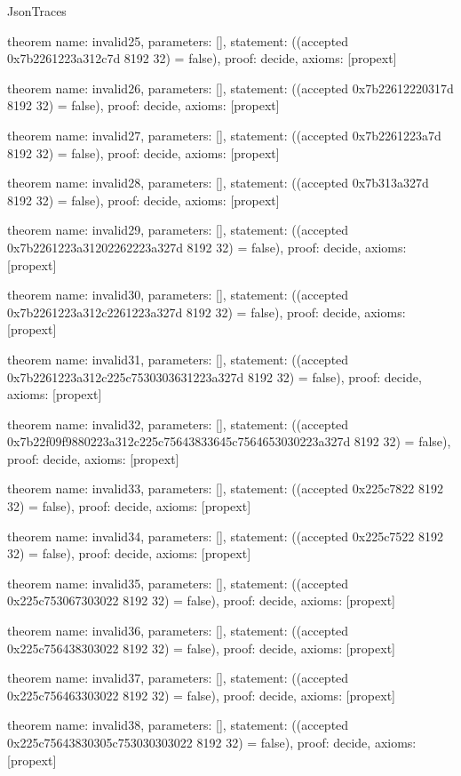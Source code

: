 \begin{lexlean}{JsonTraces}
\begin{semanticmodule}
theorem{
  name: invalid25,
  parameters: [],
  statement: ((accepted 0x7b2261223a312c7d 8192 32) = false),
  proof: decide{},
  axioms: [propext]
}

theorem{
  name: invalid26,
  parameters: [],
  statement: ((accepted 0x7b22612220317d 8192 32) = false),
  proof: decide{},
  axioms: [propext]
}

theorem{
  name: invalid27,
  parameters: [],
  statement: ((accepted 0x7b2261223a7d 8192 32) = false),
  proof: decide{},
  axioms: [propext]
}

theorem{
  name: invalid28,
  parameters: [],
  statement: ((accepted 0x7b313a327d 8192 32) = false),
  proof: decide{},
  axioms: [propext]
}

theorem{
  name: invalid29,
  parameters: [],
  statement: ((accepted 0x7b2261223a31202262223a327d 8192 32) = false),
  proof: decide{},
  axioms: [propext]
}

theorem{
  name: invalid30,
  parameters: [],
  statement: ((accepted 0x7b2261223a312c2261223a327d 8192 32) = false),
  proof: decide{},
  axioms: [propext]
}

theorem{
  name: invalid31,
  parameters: [],
  statement: ((accepted 0x7b2261223a312c225c7530303631223a327d 8192 32) = false),
  proof: decide{},
  axioms: [propext]
}

theorem{
  name: invalid32,
  parameters: [],
  statement: ((accepted 0x7b22f09f9880223a312c225c75643833645c7564653030223a327d 8192 32) = false),
  proof: decide{},
  axioms: [propext]
}

theorem{
  name: invalid33,
  parameters: [],
  statement: ((accepted 0x225c7822 8192 32) = false),
  proof: decide{},
  axioms: [propext]
}

theorem{
  name: invalid34,
  parameters: [],
  statement: ((accepted 0x225c7522 8192 32) = false),
  proof: decide{},
  axioms: [propext]
}

theorem{
  name: invalid35,
  parameters: [],
  statement: ((accepted 0x225c753067303022 8192 32) = false),
  proof: decide{},
  axioms: [propext]
}

theorem{
  name: invalid36,
  parameters: [],
  statement: ((accepted 0x225c756438303022 8192 32) = false),
  proof: decide{},
  axioms: [propext]
}

theorem{
  name: invalid37,
  parameters: [],
  statement: ((accepted 0x225c756463303022 8192 32) = false),
  proof: decide{},
  axioms: [propext]
}

theorem{
  name: invalid38,
  parameters: [],
  statement: ((accepted 0x225c75643830305c753030303022 8192 32) = false),
  proof: decide{},
  axioms: [propext]
}


\end{semanticmodule}
\end{lexlean}
